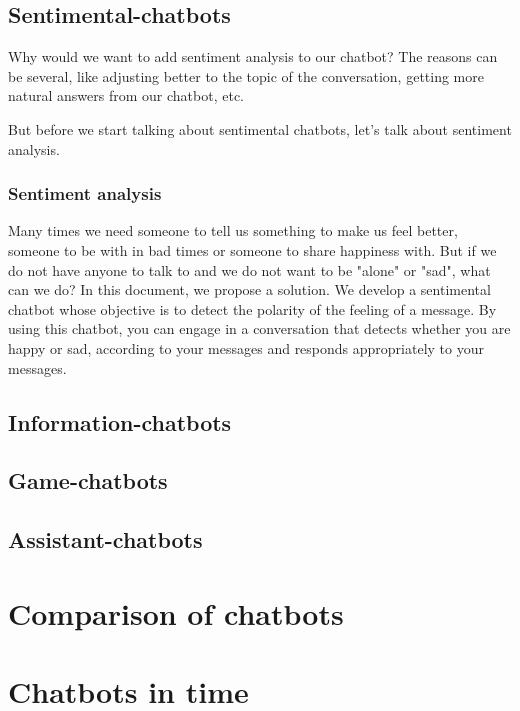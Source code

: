 \documentclass[12pt,twoside]{article}
\theoremstyle{plain}
\theoremstyle{definition}
\theoremstyle{remark}
\begin{document}
	\subsection{Sentimental-chatbots}
	\label{sec:sentimental}
	
	Why would we want to add sentiment analysis to our chatbot? The reasons can be several, like adjusting better to the topic of the conversation, getting more natural answers from our chatbot, etc.
	
	But before we start talking about sentimental chatbots, let's talk about sentiment analysis.
	
	\subsubsection{Sentiment analysis}
	\label{sec::sentiment_analysis}
	
	 
	Many times we need someone to tell us something to make us feel better, someone to be with in bad times or someone to share happiness with. But if we do not have anyone to talk to and we do not want to be "alone" or "sad", what can we do? In this document, we propose a solution. We develop a sentimental chatbot whose objective is to detect the polarity of the feeling of a message. By using this chatbot, you can engage in a conversation that detects whether you are happy or sad, according to your messages and responds appropriately to your messages.
	
	

	\subsection{Information-chatbots}
	\label{sec:information}

	\subsection{Game-chatbots}
	\label{sec:game}

	\subsection{Assistant-chatbots}
	\label{sec:assistant}
	

\section{Comparison of chatbots}
\label{sec:comparison}


\section{Chatbots in time}
\label{sec:time}
\end{document}
